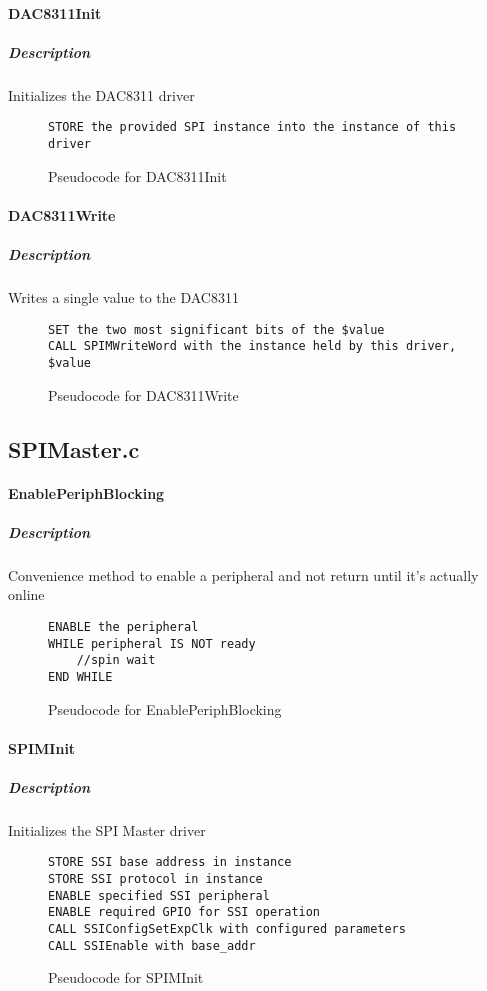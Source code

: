 \documentclass[titlepage]{article}
\begin{document}
\paragraph{DAC8311Init}
\subparagraph{Description}
Initializes the DAC8311 driver
\begin{figure}[H]
    \begin{verbatim}
STORE the provided SPI instance into the instance of this driver
    \end{verbatim}
    \caption{Pseudocode for DAC8311Init}
\end{figure}

\paragraph{DAC8311Write}
\subparagraph{Description}
Writes a single value to the DAC8311
\begin{figure}[H]
    \begin{verbatim}
SET the two most significant bits of the $value
CALL SPIMWriteWord with the instance held by this driver, $value
    \end{verbatim}
    \caption{Pseudocode for DAC8311Write}
\end{figure}

\subsection{SPIMaster.c}

\paragraph{EnablePeriphBlocking}
\subparagraph{Description}
Convenience method to enable a peripheral and not return until it's actually online
\begin{figure}[H]
    \begin{verbatim}
ENABLE the peripheral
WHILE peripheral IS NOT ready
    //spin wait
END WHILE
    \end{verbatim}
    \caption{Pseudocode for EnablePeriphBlocking}
\end{figure}

\paragraph{SPIMInit}
\subparagraph{Description}
Initializes the SPI Master driver
\begin{figure}[H]
    \begin{verbatim}
STORE SSI base address in instance
STORE SSI protocol in instance
ENABLE specified SSI peripheral
ENABLE required GPIO for SSI operation
CALL SSIConfigSetExpClk with configured parameters
CALL SSIEnable with base_addr
    \end{verbatim}
    \caption{Pseudocode for SPIMInit}
\end{figure}
\end{document}
